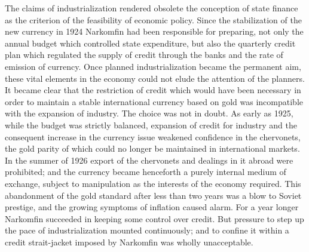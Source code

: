The claims of industrialization rendered obsolete the conception of state finance as the criterion of the feasibility of economic policy. Since the stabilization of the new currency in 1924 Narkomfin had been responsible for preparing, not only the annual budget which controlled state expenditure, but also the quarterly credit plan which regulated the supply of credit through the banks and the rate of emission of currency. Once planned industrialization became the permanent aim, these vital elements in the economy could not elude the attention of the planners. It became clear that the restriction of credit which would have been necessary in order to maintain a stable international currency based on gold was incompatible with the expansion of industry. The choice was not in doubt. As early as 1925, while the budget was strictly balanced, expansion of credit for industry and the consequent increase in the currency issue weakened confidence in the chervonets, the gold parity of which could no longer be maintained in international markets. In the summer of 1926 export of the chervonets and dealings in it abroad were prohibited; and the currency became henceforth a purely internal medium of exchange, subject to manipulation as the interests of the economy required. This abandonment of the gold standard after less than two years was a blow to Soviet prestige, and the growing symptoms of inflation caused alarm. For a year longer Narkomfin succeeded in keeping some control over credit. But pressure to step up the pace of industrialization mounted continuously; and to confine it within a credit strait-jacket imposed by Narkomfin was wholly unacceptable. 

